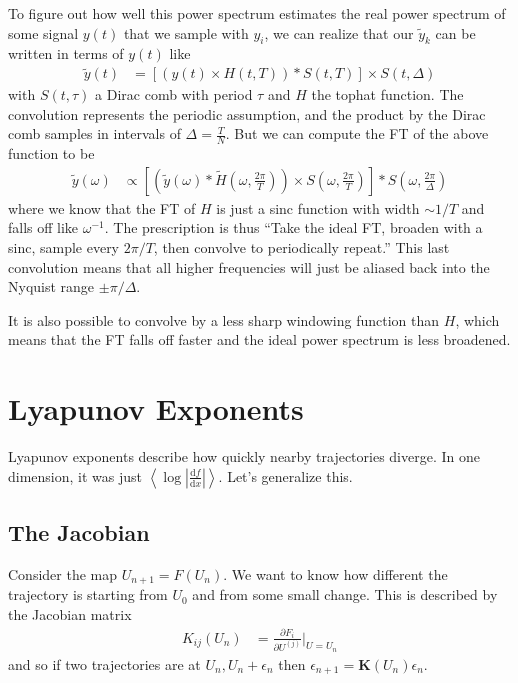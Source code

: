 \documentclass[10pt]{article}
\newcommand{\rd}[2]{\frac{\mathrm{d}#1}{\mathrm{d}#2}}
\newcommand{\pd}[2]{\frac{\partial#1}{\partial#2}}
\newcommand{\abs}[1]{\left|#1\right|}
\newcommand{\expvalue}[1]{\left<#1\right>}
\begin{document}
To figure out how well this power spectrum estimates the real power spectrum of
some signal $y(t)$ that we sample with $y_i$, we can realize that our
$\tilde{y}_k$ can be written in terms of $y(t)$ like
\begin{align}
    \tilde{y}(t) &= \left[ \left( y(t) \times H(t,T) \right) * S(t,T) \right]
    \times S(t,\Delta)
\end{align}
with $S(t,\tau)$ a Dirac comb with period $\tau$ and $H$ the tophat function.
The convolution represents the periodic assumption, and the product by the Dirac
comb samples in intervals of $\Delta = \frac{T}{N}$. But we can compute the FT
of the above function to be
\begin{align}
    \tilde{y}(\omega) &\propto \left[
        \left(
            \tilde{y}(\omega) * \tilde{H}\left( \omega, \frac{2\pi}{T} \right)
        \right) \times S\left( \omega,\frac{2\pi}{T} \right)
    \right] * S\left( \omega, \frac{2\pi}{\Delta} \right)
\end{align}
where we know that the FT of $H$ is just a sinc function with width $\sim 1/T$
and falls off like $\omega^{-1}$.  The prescription is thus ``Take the ideal FT,
broaden with a sinc, sample every $2\pi/T$, then convolve to periodically
repeat.'' This last convolution means that all higher frequencies will just be
aliased back into the Nyquist range $\pm \pi/\Delta$.

It is also possible to convolve by a less sharp windowing function than $H$,
which means that the FT falls off faster and the ideal power spectrum is less
broadened.

\clearpage

\section{Lyapunov Exponents}

Lyapunov exponents describe how quickly nearby trajectories diverge. In one
dimension, it was just $\expvalue{\log \abs{\rd{f}{x}}}$. Let's generalize this.

\subsection{The Jacobian}

Consider the map $U_{n+1} = F(U_n)$. We want to know how different the
trajectory is starting from $U_0$ and from some small change. This is described
by the Jacobian matrix
\begin{align}
    K_{ij}(U_n) &= \pd{F_i}{U^{(j)}}\Bigg|_{U=U_n}
\end{align}
and so if two trajectories are at $U_n, U_{n} + \epsilon_n$ then $\epsilon_{n+1}
= \mathbf{K}(U_n)\epsilon_n$.
\end{document}
